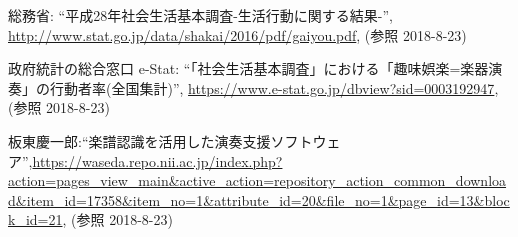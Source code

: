 \documentclass[twocolumn,10pt,a4j]{jsarticle}
\begin{document}
\begin{thebibliography}{99}
 総務省: ``平成28年社会生活基本調査-生活行動に関する結果-'', \url{http://www.stat.go.jp/data/shakai/2016/pdf/gaiyou.pdf}, (参照 2018-8-23)

 政府統計の総合窓口 e-Stat: ``「社会生活基本調査」における「趣味娯楽=楽器演奏」の行動者率(全国集計)'', \url{https://www.e-stat.go.jp/dbview?sid=0003192947}, (参照 2018-8-23)

板東慶一郎:``楽譜認識を活用した演奏支援ソフトウェア'',\url{https://waseda.repo.nii.ac.jp/index.php?action=pages_view_main&active_action=repository_action_common_download&item_id=17358&item_no=1&attribute_id=20&file_no=1&page_id=13&block_id=21}, (参照 2018-8-23)

\end{thebibliography}
\end{document}
